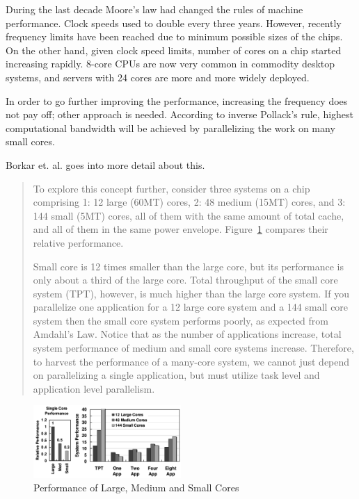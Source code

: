 \documentclass[english,11pt]{l4proj}
\begin{document}
During the last decade Moore's law had changed the rules of machine performance.
Clock speeds used to double every three years. However, recently frequency
limits have been reached due to minimum possible sizes of the chips. On the
other hand, given clock speed limits, number of cores on a chip started
increasing rapidly. 8-core CPUs are now very common in commodity desktop
systems, and servers with 24 cores are more and more widely deployed.

In order to go further improving the performance, increasing the frequency does
not pay off; other approach is needed. According to inverse Pollack's
rule\cite{pollack}, highest computational bandwidth will be achieved by
parallelizing the work on many small cores\cite{1kcorechips}.

Borkar et. al. goes into more detail about this.

\begin{quote}

    To explore this concept further, consider three systems on a chip
    comprising 1: 12 large (60MT) cores, 2: 48 medium (15MT) cores, and 3: 144
    small (5MT) cores, all of them with the same amount of total cache, and all
    of them in the same power envelope. Figure~\ref{fig:core_size_performance}
    compares their relative performance.

    Small core is 12 times smaller than the large core, but its performance is
    only about a third of the large core. Total throughput of the small core
    system (TPT), however, is much higher than the large core system. If you
    parallelize one application for a 12 large core system and a 144 small core
    system then the small core system performs poorly, as expected from Amdahl’s
    Law\cite{amdahls-law}. Notice that as the number of applications increase,
    total system performance of medium and small core systems increase.
    Therefore, to harvest the performance of a many-core system, we cannot just
    depend on parallelizing a single application, but must utilize task level
    and application level parallelism.

\end{quote}

\begin{figure}[h]
    \centering
    \includegraphics[width=0.5\textwidth]{images/pollack.png}
    \caption{Performance of Large, Medium and Small
    Cores\cite{future-microprocessors}}
    \label{fig:core_size_performance}
\end{figure}
\end{document}
